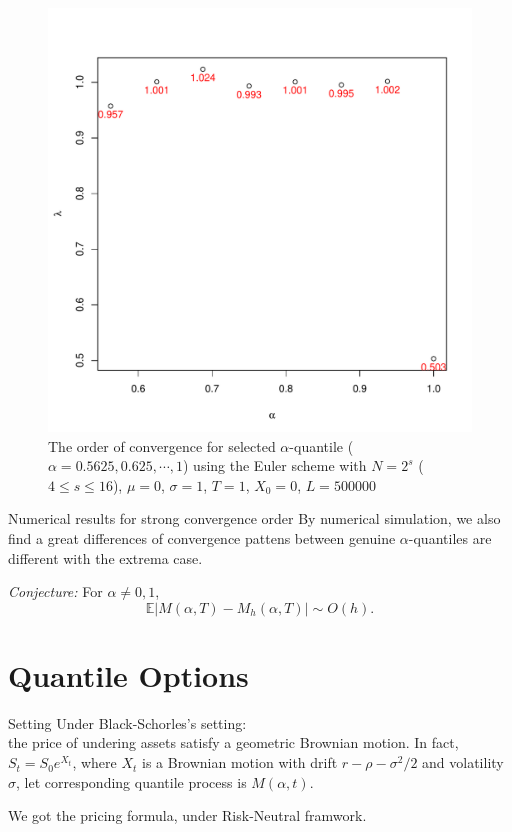 \documentclass[cjk,10pt]{beamer}
\begin{document}
\begin{frame}
\begin{figure}
   \centering
   \includegraphics[scale=0.3]{nout_0rato.pdf} %
   \caption{The order of convergence for selected $\alpha$-quantile ($\alpha = 0.5625, 0.625,  \cdots, 1$) using the Euler scheme with $N = 2^s$ ($4\le s \le 16$), $\mu=0$, $\sigma=1$, $T=1$, $X_0=0$, $L=500000$}
   \label{f:rate}
\end{figure}
\end{frame}


\begin{frame}{Numerical results for strong convergence order}
By numerical simulation, we also find a great differences of convergence pattens 
between genuine $\alpha$-quantiles are different
with the extrema case. 

\vspace{2em}
{\color{red}\em Conjecture:} For $\alpha\neq 0,1$, 
\[
\mathbb{E} |M(\alpha, T) - M_h(\alpha,T)|\sim O(h).
\]
\end{frame}

\begin{frame}

\end{frame}


\section{Quantile Options}
\begin{frame}{Setting}
Under Black-Schorles's setting:\\
the price of undering assets 
satisfy a geometric Brownian motion. 
In fact, $S_t= S_0 e^{X_t}$, 
where $X_t$ is a Brownian motion with drift $r-\rho-\sigma^2/2$ 
and volatility $\sigma$,
let corresponding quantile process is 
$M(\alpha, t)$. 

We got the pricing formula, under Risk-Neutral framwork.
\end{frame}
\end{document}
